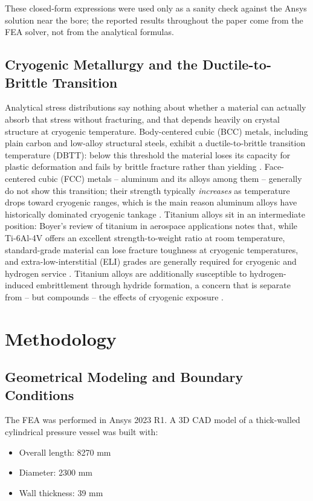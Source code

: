 \documentclass[conference]{IEEEtran}
\begin{document}
These closed-form expressions were used only as a sanity check against the Ansys solution near the bore; the reported results throughout the paper come from the FEA solver, not from the analytical formulas.

\subsection{Cryogenic Metallurgy and the Ductile-to-Brittle Transition}
Analytical stress distributions say nothing about whether a material can actually absorb that stress without fracturing, and that depends heavily on crystal structure at cryogenic temperature. Body-centered cubic (BCC) metals, including plain carbon and low-alloy structural steels, exhibit a ductile-to-brittle transition temperature (DBTT): below this threshold the material loses its capacity for plastic deformation and fails by brittle fracture rather than yielding \cite{dieter1986}. Face-centered cubic (FCC) metals -- aluminum and its alloys among them -- generally do not show this transition; their strength typically \emph{increases} as temperature drops toward cryogenic ranges, which is the main reason aluminum alloys have historically dominated cryogenic tankage \cite{kaufman1999}. Titanium alloys sit in an intermediate position: Boyer's review of titanium in aerospace applications notes that, while Ti-6Al-4V offers an excellent strength-to-weight ratio at room temperature, standard-grade material can lose fracture toughness at cryogenic temperatures, and extra-low-interstitial (ELI) grades are generally required for cryogenic and hydrogen service \cite{boyer1996}. Titanium alloys are additionally susceptible to hydrogen-induced embrittlement through hydride formation, a concern that is separate from -- but compounds -- the effects of cryogenic exposure \cite{tal2005}.

\section{Methodology}

\subsection{Geometrical Modeling and Boundary Conditions}
The FEA was performed in Ansys 2023 R1. A 3D CAD model of a thick-walled cylindrical pressure vessel was built with:
\begin{itemize}
    \item Overall length: 8270 mm
    \item Diameter: 2300 mm
    \item Wall thickness: 39 mm
\end{itemize}
\end{document}

